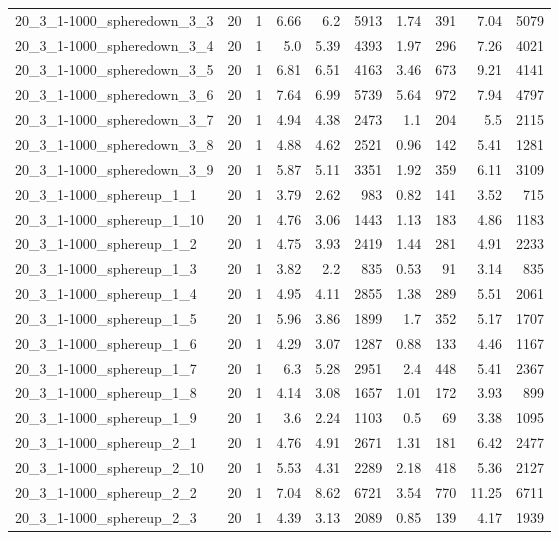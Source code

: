\begin{center}
\begin{scriptsize}
\begin{longtable}{lrrrrrrrrr}
20\_3\_1-1000\_spheredown\_3\_3 & 20 & 1 & 6.66 & 6.2 & 5913 & 1.74 & 391 & 7.04 & 5079\\
20\_3\_1-1000\_spheredown\_3\_4 & 20 & 1 & 5.0 & 5.39 & 4393 & 1.97 & 296 & 7.26 & 4021\\
20\_3\_1-1000\_spheredown\_3\_5 & 20 & 1 & 6.81 & 6.51 & 4163 & 3.46 & 673 & 9.21 & 4141\\
20\_3\_1-1000\_spheredown\_3\_6 & 20 & 1 & 7.64 & 6.99 & 5739 & 5.64 & 972 & 7.94 & 4797\\
20\_3\_1-1000\_spheredown\_3\_7 & 20 & 1 & 4.94 & 4.38 & 2473 & 1.1 & 204 & 5.5 & 2115\\
20\_3\_1-1000\_spheredown\_3\_8 & 20 & 1 & 4.88 & 4.62 & 2521 & 0.96 & 142 & 5.41 & 1281\\
20\_3\_1-1000\_spheredown\_3\_9 & 20 & 1 & 5.87 & 5.11 & 3351 & 1.92 & 359 & 6.11 & 3109\\
20\_3\_1-1000\_sphereup\_1\_1 & 20 & 1 & 3.79 & 2.62 & 983 & 0.82 & 141 & 3.52 & 715\\
20\_3\_1-1000\_sphereup\_1\_10 & 20 & 1 & 4.76 & 3.06 & 1443 & 1.13 & 183 & 4.86 & 1183\\
20\_3\_1-1000\_sphereup\_1\_2 & 20 & 1 & 4.75 & 3.93 & 2419 & 1.44 & 281 & 4.91 & 2233\\
20\_3\_1-1000\_sphereup\_1\_3 & 20 & 1 & 3.82 & 2.2 & 835 & 0.53 & 91 & 3.14 & 835\\
20\_3\_1-1000\_sphereup\_1\_4 & 20 & 1 & 4.95 & 4.11 & 2855 & 1.38 & 289 & 5.51 & 2061\\
20\_3\_1-1000\_sphereup\_1\_5 & 20 & 1 & 5.96 & 3.86 & 1899 & 1.7 & 352 & 5.17 & 1707\\
20\_3\_1-1000\_sphereup\_1\_6 & 20 & 1 & 4.29 & 3.07 & 1287 & 0.88 & 133 & 4.46 & 1167\\
20\_3\_1-1000\_sphereup\_1\_7 & 20 & 1 & 6.3 & 5.28 & 2951 & 2.4 & 448 & 5.41 & 2367\\
20\_3\_1-1000\_sphereup\_1\_8 & 20 & 1 & 4.14 & 3.08 & 1657 & 1.01 & 172 & 3.93 & 899\\
20\_3\_1-1000\_sphereup\_1\_9 & 20 & 1 & 3.6 & 2.24 & 1103 & 0.5 & 69 & 3.38 & 1095\\
20\_3\_1-1000\_sphereup\_2\_1 & 20 & 1 & 4.76 & 4.91 & 2671 & 1.31 & 181 & 6.42 & 2477\\
20\_3\_1-1000\_sphereup\_2\_10 & 20 & 1 & 5.53 & 4.31 & 2289 & 2.18 & 418 & 5.36 & 2127\\
20\_3\_1-1000\_sphereup\_2\_2 & 20 & 1 & 7.04 & 8.62 & 6721 & 3.54 & 770 & 11.25 & 6711\\
20\_3\_1-1000\_sphereup\_2\_3 & 20 & 1 & 4.39 & 3.13 & 2089 & 0.85 & 139 & 4.17 & 1939\\

\end{longtable}
\end{scriptsize}
\end{center}
